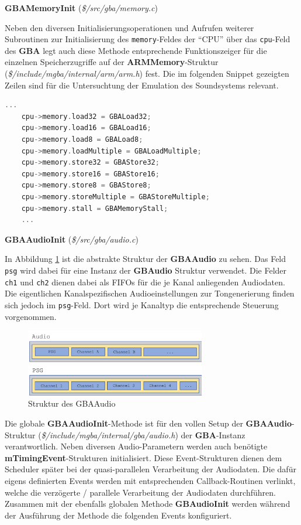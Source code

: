 \documentclass[11pt,a4paper]{scrartcl}
\newcommand{\paratitlecode}[2] {
    \vspace{5mm}
    \large \textbf{#1} \normalsize(\textit{\${#2}})
    \vspace{2mm}\newline
}
\begin{document}
\paratitlecode{GBAMemoryInit}{/src/gba/memory.c}
Neben den diversen Initialisierungsoperationen und Aufrufen weiterer Subroutinen zur Initialisierung des \verb|memory|-Feldes der \enquote{CPU} \"uber das \verb|cpu|-Feld des \textbf{GBA} legt auch diese Methode entsprechende Funktionszeiger f\"ur die einzelnen Speicherzugriffe auf der \textbf{ARMMemory}-Struktur (\textit{\$/include/mgba/internal/arm/arm.h}) fest. Die im folgenden Snippet gezeigten Zeilen sind f\"ur die Untersuchtung der Emulation des Soundsystems relevant.

\vspace{5mm}
\begin{lstlisting}[language=C++, caption={Ausschnitt aus der \textbf{GBAMemoryInit}-Methode}, label={list:GBAMemoryInit}]
    ...
    cpu->memory.load32 = GBALoad32;
    cpu->memory.load16 = GBALoad16;
    cpu->memory.load8 = GBALoad8;
    cpu->memory.loadMultiple = GBALoadMultiple;
    cpu->memory.store32 = GBAStore32;
    cpu->memory.store16 = GBAStore16;
    cpu->memory.store8 = GBAStore8;
    cpu->memory.storeMultiple = GBAStoreMultiple;
    cpu->memory.stall = GBAMemoryStall;
    ...
\end{lstlisting}

\newpage
\paratitlecode{GBAAudioInit}{/src/gba/audio.c}
In Abbildung \ref{fig:gbaaudio} ist die abstrakte Struktur der \textbf{GBAAudio} zu sehen. Das Feld \verb|psg| wird dabei f\"ur eine Instanz der \textbf{GBAudio} Struktur verwendet. Die Felder \verb|ch1| und \verb|ch2| dienen dabei als FIFOs f\"ur die je Kanal anliegenden Audiodaten. Die eigentlichen Kanalspezifischen Audioeinstellungen zur Tongenerierung finden sich jedoch im \verb|psg|-Feld. Dort wird je Kanaltyp die entsprechende Steuerung vorgenommen.

\begin{figure}[h]
    \centering
    \includegraphics[width=0.7\textwidth]{Emulator_Audio}
    \caption{Struktur des GBAAudio}
    \label{fig:gbaaudio}
\end{figure}

Die globale \textbf{GBAAudioInit}-Methode ist f\"ur den vollen Setup der \textbf{GBAAudio}-Struktur (\textit{\$/include/mgba/internal/gba/audio.h}) der \textbf{GBA}-Instanz verantwortlich. Neben diversen Audio-Parametern werden auch ben\"otigte \textbf{mTimingEvent}-Strukturen initialisiert. Diese Event-Strukturen dienen dem Scheduler sp\"ater bei der quasi-parallelen Verarbeitung der Audiodaten. Die daf\"ur eigens definierten Events werden mit entsprechenden Callback-Routinen verlinkt, welche die verz\"ogerte / parallele Verarbeitung der Audiodaten durchf\"uhren. Zusammen mit der ebenfalls globalen Methode \textbf{GBAudioInit} werden w\"ahrend der Ausf\"uhrung der Methode die folgenden Events konfiguriert.
\end{document}

